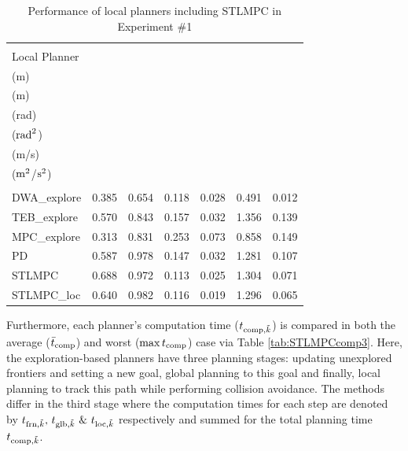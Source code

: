 \documentclass[journal]{IEEEtran}
\begin{document}
\begin{table}[ht]
  \caption{Performance of local planners including STLMPC in Experiment \#1}
  \label{tab:STLMPCexp3}
  \vspace{-8pt}
  \centering
  \begin{tabular}{l@{\hskip 3.4pt}c@{\hskip 4pt}c@{\hskip 6pt}c@{\hskip 5pt}c@{\hskip 4pt}c@{\hskip 4pt}c}
    \toprule\\[-0.85em]
    \scriptsize Local Planner & \makecell{\scriptsize$\min_{\tilde k} d_{\textup{min},\tilde k}$\\[0.2em](m)} & \makecell{\scriptsize$\bar{d}_\textup{min}$\\[0.3em](m)} & \makecell{\scriptsize$\overline{|\delta_{\textup{cmd},\tilde k}|}$\\[0.2em](rad)} & \makecell{\scriptsize$\mathrm{Var}(\delta_{\textup{cmd},\tilde k})$\\[0.2em]($\textup{rad}^2$)} & \makecell{\scriptsize$\bar{v}_{\textup{cmd},\tilde k}$\\[0.3em](m/s)} & \makecell{\scriptsize$\mathrm{Var}(v_{\textup{cmd},\tilde k})$\\[0.2em]($\textup{m}^2$/$\textup{s}^2$)}\\
    \midrule\\[-0.85em]
    \scriptsize DWA\_explore      & 0.385 & 0.654 & 0.118 & 0.028 & 0.491 & 0.012 \\
    \scriptsize TEB\_explore     & 0.570 & 0.843 & 0.157 & 0.032 & 1.356 & 0.139  \\
    \scriptsize MPC\_explore   & 0.313 & 0.831 & 0.253 & 0.073 & 0.858 & 0.149  \\
    \scriptsize PD   & 0.587 & 0.978 & 0.147 & 0.032 & 1.281 & 0.107  \\
    \scriptsize STLMPC   & 0.688 & 0.972 & 0.113 & 0.025 & 1.304 & 0.071  \\
    \scriptsize STLMPC\_loc   & 0.640 & 0.982 & 0.116 & 0.019 & 1.296 & 0.065  \\
    \bottomrule
  \end{tabular}
\end{table}

Furthermore, each planner's computation time ($t_{\textup{comp},\tilde k}$) is compared in both the average ($\bar{t}_\textup{comp}$) and worst ($\displaystyle\max t_\textup{comp}$) case via Table \ref{tab:STLMPCcomp3}. Here, the exploration-based planners have three planning stages: updating unexplored frontiers and setting a new goal, global planning to this goal and finally, local planning to track this path while performing collision avoidance. The methods differ in the third stage where the computation times for each step are denoted by $t_{\textup{frn},\tilde k},\,t_{\textup{glb},\tilde k}\ \& \ t_{\textup{loc},\tilde k}$ respectively and summed for the total planning time $t_{\textup{comp},\tilde k}$.
\end{document}

